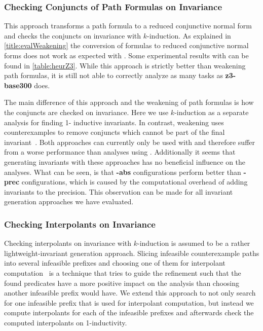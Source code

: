\subsubsection*{Checking Conjuncts of Path Formulas on Invariance}
This approach transforms a path formula to a reduced conjunctive normal form and checks the conjuncts on invariance with $k$-induction. As explained in \autoref{title:evalWeakening} the conversion of
formulas to reduced conjunctive normal forms does not work as expected with \MathSAT{}. Some experimental results with \ZT{} can be found in \autoref{table:heurZ3}. While this approach is strictly better
than weakening path formulas, it is still not able to correctly analyze as many tasks as \textbf{z3-base300} does.

The main difference of this approach and the weakening of path formulas is how the conjuncts are checked on invariance. Here we use $k$-induction as a separate analysis for finding 1-
inductive invariants. In contrast, weakening uses counterexamples to remove conjuncts which cannot be part of the final invariant~\cite{Karpenkov:Slicing}. Both approaches can currently
only be used with \ZT{} and therefore suffer from a worse performance than analyses using \MathSAT{}. Additionally it seems that generating invariants with these approaches has no beneficial influence on the 
analyses. What can be seen, is that \textbf{-abs} configurations perform better than \textbf{-prec} configurations, which is caused by the computational overhead of adding invariants to the precision. This 
observation can be made for all invariant generation approaches we have evaluated.

\subsubsection*{Checking Interpolants on Invariance}

Checking interpolants on invariance with $k$-induction is assumed to be a rather lightweight-invariant generation approach. Slicing infeasible counterexample paths into several infeasible prefixes
and choosing one of them for interpolant computation~\cite{Beyer:RefinementSelection} is a technique that tries to guide the refinement such that the found predicates have a more positive impact on the
analysis than choosing another infeasible prefix would have. We extend this approach to not only search for one infeasible prefix that is used for interpolant computation, but instead we compute interpolants for each of the infeasible prefixes and afterwards check the computed interpolants on 1-inductivity.

